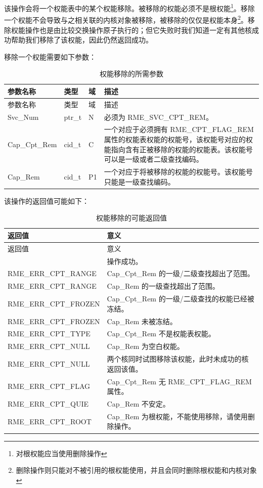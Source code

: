 该操作会将一个权能表中的某个权能移除。被移除的权能必须不是根权能\footnote{对根权能应当使用删除操作}。移除一个权能不会导致与之相关联的内核对象被移除，被移除的仅仅是权能本身\footnote{删除操作则只能对不被引用的根权能使用，并且会同时删除根权能和内核对象}。移除权能操作也是由比较交换操作原子执行的；但它失败时我们知道一定有其他核成功帮助我们移除了该权能，因此仍然返回成功。

移除一个权能需要如下参数：

\begin{xltabular}{\textwidth}{@{}>{\hsize\raggedright\arraybackslash}X>{\hsize\raggedright\arraybackslash}X>{\hsize\raggedright\arraybackslash}X>{\hsize\raggedright\arraybackslash}X@{}}
\caption{权能移除的所需参数}\label{tab:2-13-capability-removal-parameters}\\
\toprule
参数名称 & 类型 & 域 & 描述\tabularnewline
\endfirsthead
\toprule
参数名称 & 类型 & 域 & 描述\tabularnewline
\midrule
\endhead
\bottomrule
\endlastfoot
Svc\_Num & ptr\_t & N & 必须为 RME\_SVC\_CPT\_REM。\tabularnewline
Cap\_Cpt\_Rem & cid\_t & C &
一个对应于必须拥有 RME\_CPT\_FLAG\_REM 属性的权能表权能的权能号，该权能号对应的权能指向含有正被移除的权能的权能表。该权能号可以是一级或者二级查找编码。\tabularnewline
Cap\_Rem & cid\_t & P1 &
一个对应于将被移除的权能的权能号。该权能号只能是一级查找编码。\tabularnewline
\end{xltabular}

该操作的返回值可能如下：

\begin{xltabular}{\textwidth}{@{}>{\hsize\raggedright\arraybackslash}X>{\hsize\raggedright\arraybackslash}X@{}}
\caption{权能移除的可能返回值}\label{tab:2-14-capability-removal-return-values}\\
\toprule
返回值 & 意义\tabularnewline
\endfirsthead
\toprule
返回值 & 意义\tabularnewline
\midrule
\endhead
\bottomrule
{} & 操作成功。\tabularnewline
    RME\_ERR\_CPT\_RANGE & Cap\_Cpt\_Rem 的一级/二级查找超出了范围。\tabularnewline
    RME\_ERR\_CPT\_RANGE & Cap\_Rem 的一级查找超出了范围。\tabularnewline
    RME\_ERR\_CPT\_FROZEN & Cap\_Cpt\_Rem 的一级/二级查找的权能已经被冻结。\tabularnewline
    RME\_ERR\_CPT\_FROZEN & Cap\_Rem 未被冻结。\tabularnewline
    RME\_ERR\_CPT\_TYPE & Cap\_Cpt\_Rem 不是权能表权能。\tabularnewline
    RME\_ERR\_CPT\_NULL & Cap\_Rem 为空白权能。\tabularnewline
    RME\_ERR\_CPT\_NULL & 两个核同时试图移除该权能，此时未成功的核返回该值。\tabularnewline
    RME\_ERR\_CPT\_FLAG & Cap\_Cpt\_Rem 无 RME\_CPT\_FLAG\_REM 属性。\tabularnewline
    RME\_ERR\_CPT\_QUIE & Cap\_Rem 不安定。\tabularnewline
    RME\_ERR\_CPT\_ROOT & Cap\_Rem 为根权能，不能使用移除，请使用删除操作。\tabularnewline
\end{xltabular}

